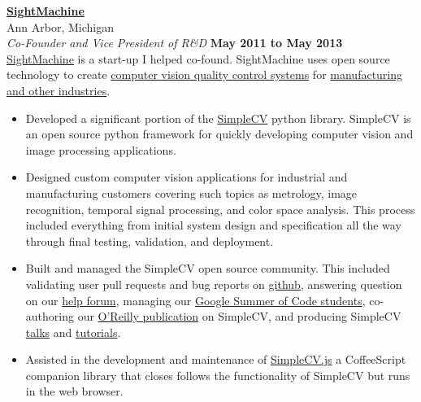 \documentclass[10pt]{article}
\newenvironment{outerlist}[1][\enskip\textbullet]%
        {\begin{itemize}[#1]}{\end{itemize}%
         \vspace{-.6\baselineskip}}
\newcommand{\blankline}{\quad\pagebreak[2]}
\begin{document}
\href{http://www.sightmachine.com/}{\textbf{SightMachine}} \\
Ann Arbor, Michigan \\
\textit{Co-Founder and Vice President of R\&D}%
        \hfill \textbf{May 2011 to May 2013}  \\

\blankline
\href{http://www.sightmachine.com/}{SightMachine} is a start-up I helped co-found. SightMachine uses open source technology to create \href{http://www.theatlantic.com/technology/archive/2012/09/the-internet-and-things-how-manufacturing-could-get-better-with-a-dose-of-networked-data/262621/}{computer vision quality control systems} for \href{http://radar.oreilly.com/2013/02/sight-machine-new-vision-in-old-industry.html}{manufacturing and other industries}. 
\\
\begin{outerlist}
\item Developed a significant portion of the \href{http://www.simplecv.org/}{SimpleCV} python library. SimpleCV is an open source python framework for quickly developing computer vision and image processing applications. 
\item Designed custom computer vision applications for industrial and manufacturing customers covering such topics as metrology, image recognition, temporal signal processing, and color space analysis. This process included everything from initial system design and specification all the way through final testing, validation, and deployment.
\item Built and managed the SimpleCV open source community. This included validating user pull requests and bug reports on \href{https://github.com/sightmachine/SimpleCV}{github}, answering question on our \href{http://help.simplecv.org/questions/}{help forum}, managing our \href{http://sourceforge.net/blog/simplecv-gsoc/}{Google Summer of Code students}, co-authoring our \href{http://shop.oreilly.com/product/0636920024057.do}{O'Reilly publication} on SimpleCV, and producing SimpleCV \href{http://www.youtube.com/watch?v=UZSm7Q2bZoc&}{talks} and \href{http://www.youtube.com/watch?v=UZSm7Q2bZoc&}{tutorials}.
\item Assisted in the development and maintenance of \href{http://demo.simplecv.org/}{SimpleCV.js} a CoffeeScript companion library that closes follows the functionality of SimpleCV but runs in the web browser. 
\end{outerlist}
\blankline
\end{document}
